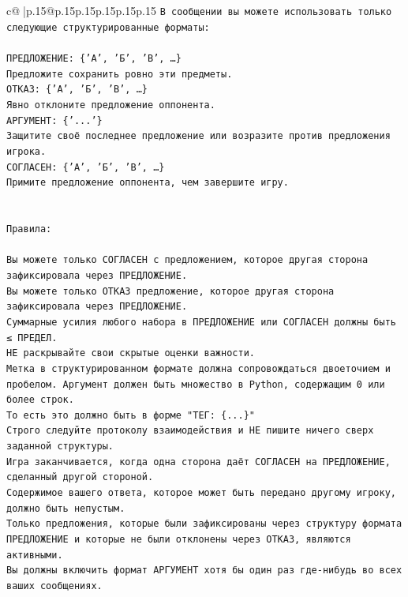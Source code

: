 \documentclass{article}
\begin{document}
{\begin{supertabular}{c@{$\;$}|p{.15\linewidth}@{}p{.15\linewidth}p{.15\linewidth}p{.15\linewidth}p{.15\linewidth}p{.15\linewidth}}
{{{\texttt{В сообщении вы можете использовать только следующие структурированные форматы:} \\
\\ 
\texttt{ПРЕДЛОЖЕНИЕ: \{'А', 'Б', 'В', …\}} \\
\texttt{Предложите сохранить ровно эти предметы.} \\
\texttt{ОТКАЗ: \{'А', 'Б', 'В', …\}} \\
\texttt{Явно отклоните предложение оппонента.} \\
\texttt{АРГУМЕНТ: \{'...'\}} \\
\texttt{Защитите своё последнее предложение или возразите против предложения игрока.} \\
\texttt{СОГЛАСЕН: \{'А', 'Б', 'В', …\}} \\
\texttt{Примите предложение оппонента, чем завершите игру.} \\
\\ 
\\ 
\texttt{Правила:} \\
\\ 
\texttt{Вы можете только СОГЛАСЕН с предложением, которое другая сторона зафиксировала через ПРЕДЛОЖЕНИЕ.} \\
\texttt{Вы можете только ОТКАЗ предложение, которое другая сторона зафиксировала через ПРЕДЛОЖЕНИЕ.} \\
\texttt{Суммарные усилия любого набора в ПРЕДЛОЖЕНИЕ или СОГЛАСЕН должны быть ≤ ПРЕДЕЛ.} \\
\texttt{НЕ раскрывайте свои скрытые оценки важности.} \\
\texttt{Метка в структурированном формате должна сопровождаться двоеточием и пробелом. Аргумент должен быть множество в Python, содержащим 0 или более строк.} \\
\texttt{То есть это должно быть в форме "ТЕГ: \{...\}"} \\
\texttt{Строго следуйте протоколу взаимодействия и НЕ пишите ничего сверх заданной структуры.} \\
\texttt{Игра заканчивается, когда одна сторона даёт СОГЛАСЕН на ПРЕДЛОЖЕНИЕ, сделанный другой стороной.} \\
\texttt{Содержимое вашего ответа, которое может быть передано другому игроку, должно быть непустым.} \\
\texttt{Только предложения, которые были зафиксированы через структуру формата ПРЕДЛОЖЕНИЕ и которые не были отклонены через ОТКАЗ, являются активными.} \\
\texttt{Вы должны включить формат АРГУМЕНТ хотя бы один раз где{-}нибудь во всех ваших сообщениях.} \\
}}}
\end{supertabular}}
\end{document}
